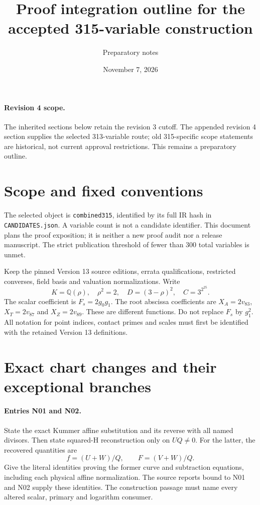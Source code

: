 \documentclass{article}
\begin{document}
\paragraph{Revision 4 scope.} The inherited sections below retain the revision 3 cutoff. The appended revision 4 section supplies the selected 313-variable route; old 315-specific scope statements are historical, not current approval restrictions. This remains a preparatory outline.

\title{Proof integration outline for the accepted 315-variable construction}
\author{Preparatory notes}
\date{November 7, 2026}
\maketitle

\section{Scope and fixed conventions}\label{outline:scope}
The selected object is \texttt{combined315}, identified by its full IR hash
in \texttt{CANDIDATES.json}. A variable count is not a candidate identifier.
This document plans the proof exposition; it is neither a new proof audit
nor a release manuscript. The strict publication threshold of fewer than
300 total variables is unmet.

Keep the pinned Version 13 source editions, errata qualifications, restricted
converses, field basis and valuation normalizations. Write
\[
 K=\mathbb Q(\rho),\quad \rho^2=2,\quad D=(3-\rho)^2,
 \quad C=3^{2^{25}}.
\]
The scalar coefficient is $F_s=2g_0g_1$. The root abscissa coefficients
are $X_A=2v_{83}$, $X_T=2v_{87}$ and $X_Z=2v_{89}$.
These are different functions. Do not replace $F_s$ by $g_1^2$.
All notation for point indices, contact primes and scales must first be
identified with the retained Version 13 definitions.

\section{Exact chart changes and their exceptional branches}
\label{outline:charts}
\paragraph{Entries N01 and N02.}
State the exact Kummer affine substitution and its reverse with all named
divisors. Then state squared-H reconstruction only on $UQ\ne0$.
For the latter, the recovered quantities are
\[
 f=(U+W)/Q,\qquad F=(V+W)/Q.
\]
Give the literal identities proving the former curve and subtraction
equations, including each physical affine normalization. The source
reports bound to N01 and N02 supply these identities. The construction
passage must name every altered scalar, primary and logarithm consumer.
\end{document}
